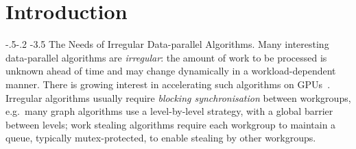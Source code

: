 \documentclass[sigconf]{acmart}
\makeatletter
\renewcommand\paragraph{\@startsection{paragraph}{4}{\z@}%
  {-.5\baselineskip \@plus -2\p@ \@minus -.2\p@}%
  {-3.5\p@}%
  {\bfseries\@parfont}}
\makeatother
\begin{document}



%
%





\maketitle

\newcommand{\myparagraph}[1]{\paragraph{#1.}}


\section{Introduction}\label{sec:intro}

\myparagraph{The Needs of Irregular Data-parallel Algorithms}
Many interesting data-parallel algorithms are \emph{irregular}: the
amount of work to be processed is unknown ahead of time and may change dynamically in a workload-dependent manner.
There is growing interest in
accelerating such algorithms on
GPUs~\cite{owens-persistent,DBLP:conf/ipps/KaleemVPHP16,DBLP:conf/ipps/DavidsonBGO14,DBLP:conf/hipc/HarishN07,DBLP:journals/topc/MerrillGG15,DBLP:conf/egh/VineetHPN09,DBLP:conf/ppopp/NobariCKB12,DBLP:conf/hpcc/SolomonTT10a,DBLP:conf/popl/PrabhuRMH11,DBLP:conf/ppopp/Mendez-LojoBP12,DBLP:conf/oopsla/PaiP16,DBLP:conf/oopsla/SorensenDBGR16,DBLP:conf/egh/CedermanT08,TPO10,BNP12,Pannotia}.
%
Irregular algorithms usually require \emph{blocking synchronisation}
between workgroups, e.g.\ many graph algorithms use a level-by-level
strategy, with a global barrier between levels; work
stealing algorithms require each workgroup to maintain a queue,
typically mutex-protected, to enable stealing by other
workgroups.
\end{document}
